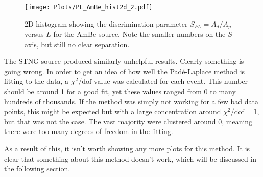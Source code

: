\documentclass[11pt]{article}
\numberwithin{equation}{section}
\numberwithin{figure}{section}
\numberwithin{table}{section}
\begin{document}
\begin{figure}[H]
    \begin{center}
        \texttt{[image: Plots/PL\_AmBe\_hist2d\_2.pdf]}
        \caption{2D histogram showing the discrimination parameter $S_{PL}=A_d/A_p$ versus $L$ for the AmBe source. Note the smaller numbers on the $S$ axis, but still no clear separation. }
        \label{fig:PL_AmBe_hist2d_2}
    \end{center}
\end{figure}

\par The STNG source produced similarly unhelpful results. Clearly something is going wrong. In order to get an idea of how well the Pad\'e-Laplace method is fitting to the data, a $\chi^2/\mathrm{dof}$ value was calculated for each event. This number should be around 1 for a good fit, yet these values ranged from 0 to many hundreds of thousands. If the method was simply not working for a few bad data points, this might be expected but with a large concentration around $\chi^2/\mathrm{dof}=1$, but that was not the case. The vast majority were clustered around 0, meaning there were too many degrees of freedom in the fitting. 
\par As a result of this, it isn't worth showing any more plots for this method. It is clear that something about this method doesn't work, which will be discussed in the following section.
\end{document}
